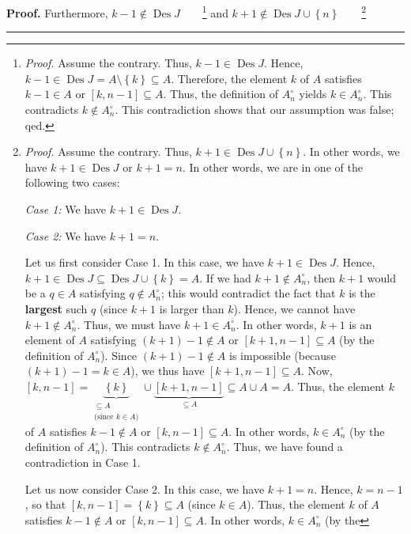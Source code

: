 \documentclass[numbers=enddot,12pt,final,onecolumn,notitlepage]{scrartcl}%
\theoremstyle{definition}
\newenvironment{proof}[1][Proof]{\noindent\textbf{#1.} }{\ \rule{0.5em}{0.5em}}
\begin{document}
\begin{proof}
Furthermore, $k-1\notin\operatorname*{Des}J$\ \ \ \ \footnote{\textit{Proof.}
Assume the contrary. Thus, $k-1\in\operatorname*{Des}J$. Hence, $k-1\in
\operatorname*{Des}J=A\setminus\left\{  k\right\}  \subseteq A$. Therefore,
the element $k$ of $A$ satisfies $k-1\in A$ or $\left[  k,n-1\right]
\subseteq A$. Thus, the definition of $A_{n}^{\circ}$ yields $k\in
A_{n}^{\circ}$. This contradicts $k\notin A_{n}^{\circ}$. This contradiction
shows that our assumption was false; qed.} and $k+1\notin\operatorname*{Des}%
J\cup\left\{  n\right\}  $\ \ \ \ \footnote{\textit{Proof.} Assume the
contrary. Thus, $k+1\in\operatorname*{Des}J\cup\left\{  n\right\}  $. In other
words, we have $k+1\in\operatorname*{Des}J$ or $k+1=n$. In other words, we are
in one of the following two cases:
\par
\textit{Case 1:} We have $k+1\in\operatorname*{Des}J$.
\par
\textit{Case 2:} We have $k+1=n$.
\par
Let us first consider Case 1. In this case, we have $k+1\in\operatorname*{Des}%
J$. Hence, $k+1\in\operatorname*{Des}J\subseteq\operatorname*{Des}%
J\cup\left\{  k\right\}  =A$. If we had $k+1\notin A_{n}^{\circ}$, then $k+1$
would be a $q\in A$ satisfying $q\notin A_{n}^{\circ}$; this would contradict
the fact that $k$ is the \textbf{largest} such $q$ (since $k+1$ is larger than
$k$). Hence, we cannot have $k+1\notin A_{n}^{\circ}$. Thus, we must have
$k+1\in A_{n}^{\circ}$. In other words, $k+1$ is an element of $A$ satisfying
$\left(  k+1\right)  -1\notin A$ or $\left[  k+1,n-1\right]  \subseteq A$ (by
the definition of $A_{n}^{\circ}$). Since $\left(  k+1\right)  -1\notin A$ is
impossible (because $\left(  k+1\right)  -1=k\in A$), we thus have $\left[
k+1,n-1\right]  \subseteq A$. Now, $\left[  k,n-1\right]
=\underbrace{\left\{  k\right\}  }_{\substack{\subseteq A\\\text{(since }k\in
A\text{)}}}\cup\underbrace{\left[  k+1,n-1\right]  }_{\subseteq A}\subseteq
A\cup A=A$. Thus, the element $k$ of $A$ satisfies $k-1\notin A$ or $\left[
k,n-1\right]  \subseteq A$. In other words, $k\in A_{n}^{\circ}$ (by the
definition of $A_{n}^{\circ}$). This contradicts $k\notin A_{n}^{\circ}$.
Thus, we have found a contradiction in Case 1.
\par
Let us now consider Case 2. In this case, we have $k+1=n$. Hence, $k=n-1$, so
that $\left[  k,n-1\right]  =\left\{  k\right\}  \subseteq A$ (since $k\in
A$). Thus, the element $k$ of $A$ satisfies $k-1\notin A$ or $\left[
k,n-1\right]  \subseteq A$. In other words, $k\in A_{n}^{\circ}$ (by the
}
\end{proof}
\end{document}
